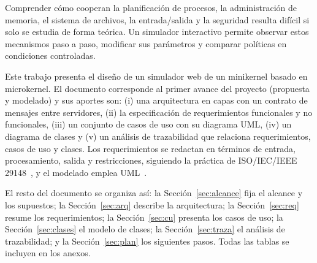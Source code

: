 \documentclass[conference]{IEEEtran}
\begin{document}
Comprender cómo cooperan la planificación de procesos, la administración de memoria, el sistema de archivos, la entrada/salida y la seguridad resulta difícil si solo se estudia de forma teórica. Un simulador interactivo permite observar estos mecanismos paso a paso, modificar sus parámetros y comparar políticas en condiciones controladas.

Este trabajo presenta el diseño de un simulador web de un minikernel basado en microkernel. El documento corresponde al primer avance del proyecto (propuesta y modelado) y sus aportes son: (i) una arquitectura en capas con un contrato de mensajes entre servidores, (ii) la especificación de requerimientos funcionales y no funcionales, (iii) un conjunto de casos de uso con su diagrama UML, (iv) un diagrama de clases y (v) un análisis de trazabilidad que relaciona requerimientos, casos de uso y clases. Los requerimientos se redactan en términos de entrada, procesamiento, salida y restricciones, siguiendo la práctica de ISO/IEC/IEEE 29148~\cite{iso29148}, y el modelado emplea UML~\cite{uml}.

El resto del documento se organiza así: la Sección~\ref{sec:alcance} fija el alcance y los supuestos; la Sección~\ref{sec:arq} describe la arquitectura; la Sección~\ref{sec:req} resume los requerimientos; la Sección~\ref{sec:cu} presenta los casos de uso; la Sección~\ref{sec:clases} el modelo de clases; la Sección~\ref{sec:traza} el análisis de trazabilidad; y la Sección~\ref{sec:plan} los siguientes pasos. Todas las tablas se incluyen en los anexos.
\end{document}
